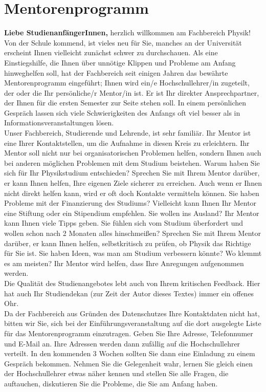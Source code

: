 \section{Mentorenprogramm}
\textbf{Liebe StudienanfängerInnen,}
\medskip
herzlich willkommen am Fachbereich Physik!\\
Von der Schule kommend, ist vieles neu für Sie, manches an der Universität erscheint Ihnen vielleicht zunächst schwer zu durchschauen. Als eine Einstiegshilfe, die Ihnen über unnötige Klippen und Probleme am Anfang hinweghelfen soll, hat der Fachbereich seit einigen Jahren das bewährte Mentorenprogramm eingeführt; Ihnen wird ein/e Hochschullehrer/in zugeteilt, der oder die Ihr persönliche/r Mentor/in ist. Er ist Ihr direkter Ansprechpartner, der Ihnen für die ersten Semester zur Seite stehen soll. In einem persönlichen Gespräch lassen sich viele Schwierigkeiten des Anfangs oft viel besser als in Informationsveranstaltungen lösen.\\
Unser Fachbereich, Studierende und Lehrende, ist sehr familiär. Ihr Mentor ist eine Ihrer Kontaktstellen, um die Aufnahme in diesen Kreis zu erleichtern. Ihr Mentor soll nicht nur bei organisatorischen Problemen helfen, sondern Ihnen auch bei anderen möglichen Problemen mit dem Studium beistehen. Warum haben Sie sich für Ihr Physikstudium entschieden? Sprechen Sie mit Ihrem Mentor darüber, er kann Ihnen helfen, Ihre eigenen Ziele sicherer zu erreichen. Auch wenn er Ihnen nicht direkt helfen kann, wird er oft doch Kontakte vermitteln können. Sie haben Probleme mit der Finanzierung des Studiums? Vielleicht kann Ihnen Ihr Mentor eine Stiftung oder ein Stipendium empfehlen. Sie wollen ins Ausland? Ihr Mentor kann Ihnen viele Tipps geben. Sie fühlen sich vom Studium überfordert und wollen schon nach 2 Monaten alles hinschmei\ss en? Sprechen Sie mit Ihrem Mentor darüber, er kann Ihnen helfen, selbstkritisch zu prüfen, ob Physik das Richtige für Sie ist. Sie haben Ideen, was man am Studium verbessern könnte? Wo klemmt es am meisten? Ihr Mentor wird helfen, dass Ihre Anregungen aufgenommen werden.\\
Die Qualität des Studienangebotes lebt auch von Ihrem kritischen Feedback. Hier hat auch Ihr Studiendekan (zur Zeit der Autor dieses Textes) immer ein offenes Ohr.\\
Da der Fachbereich aus Gründen des Datenschutzes Ihre Kontaktdaten nicht hat, bitten wir Sie, sich bei der Einführungsveranstaltung auf die dort ausgelegte Liste für das Mentorenprogramm einzutragen. Geben Sie Ihre Adresse, Telefonnumer und E-Mail an. Ihre Adressen werden dann zufällig auf die Hochschullehrer verteilt. In den kommenden 3 Wochen sollten Sie dann eine Einladung zu einem Gespräch bekommen. Nehmen Sie die Gelegenheit wahr, lernen Sie gleich einen der Hochschullehrer etwas näher kennen und stellen Sie alle Fragen, die auftauchen, diskutieren Sie die Probleme, die Sie am Anfang haben.\\

